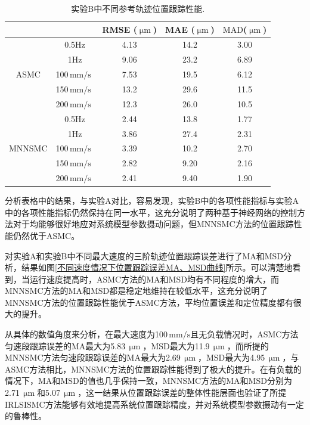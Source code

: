 \begin{table}[H]
	\caption{实验B中不同参考轨迹位置跟踪性能.}
	\label{实验B}
	\centering
	\setlength{\tabcolsep}{3mm} 
	\begin{tabular}{ccccc}
		\toprule[1.5pt]
		& \text{参考轨迹} & RMSE ($\text{$\upmu$m}$) & MAE ($\text{$\upmu$m}$) & $\text{MAD}$($\text{$\upmu$m}$)   \\ 
		\midrule
		\multirow{5}{*}{ASMC}     
		& 0.5Hz           & 4.13      & 14.2 &3.00   \\ 
		& 1Hz             & 9.06      & 23.2 &6.89   \\ 
		& 100\,$\text{mm/s }$            & 7.53      & 19.5 &6.12   \\  
		& 150\,$\text{mm/s }$             & 13.2      & 29.6 &11.5    \\ 
		& 200\,$\text{mm/s }$             & 12.3      & 26.0 &10.5     \\
		\midrule
		\multirow{5}{*}{MNNSMC} 
		& 0.5Hz           & 2.44      & 13.8 &1.77    \\ 
		& 1Hz             & 3.86      & 27.4 &2.31    \\ 
		& 100\,$\text{mm/s }$            & 3.39      & 10.2 &2.70  \\  
		& 150\,$\text{mm/s }$             & 2.82      & 9.20 &2.16     \\ 
		& 200\,$\text{mm/s }$             & 2.41      & 9.40 &1.90     \\
		\bottomrule[1.5pt]
	\end{tabular}
\end{table}

分析表格中的结果，与实验A对比，容易发现，实验B中的各项性能指标与实验A中的各项性能指标仍然保持在同一水平，这充分说明了两种基于神经网络的控制方法对于均能够很好地应对系统模型参数摄动问题，但MNNSMC方法的位置跟踪性能仍然优于ASMC。

对实验A和实验B中不同最大速度的三阶轨迹位置跟踪误差进行了MA和MSD分析，结果如图\ref{不同速度情况下位置跟踪误差MA、MSD曲线}所示。可以清楚地看到，当运行速度提高时，ASMC方法的MA和MSD均有不同程度的增大，而MNNSMC方法的MA和MSD都是稳定地维持在较低水平，这充分说明了MNNSMC方法的位置跟踪性能优于ASMC方法，平均位置误差和定位精度都有很大的提升。

从具体的数值角度来分析，在最大速度为100\,$\text{mm/s}$且无负载情况时，ASMC方法匀速段跟踪误差的MA最大为5.83\,$\text{$\upmu$m}$，MSD最大为11.9\,$\text{$\upmu$m}$，而所提的MNNSMC方法匀速段跟踪误差的MA最大为2.69\,$\text{$\upmu$m}$，MSD最大为4.95\,$\text{$\upmu$m}$，与ASMC方法相比，MNNSMC方法的位置跟踪性能得到了极大的提升。在有负载的情况下，MA和MSD的值也几乎保持一致，MNNSMC方法的MA和MSD分别为2.71\,$\text{$\upmu$m}$和5.07\,$\text{$\upmu$m}$，这一结果从位置跟踪误差的整体性能层面也验证了所提IRLSISMC方法能够有效地提高系统位置跟踪精度，并对系统模型参数摄动有一定的鲁棒性。


